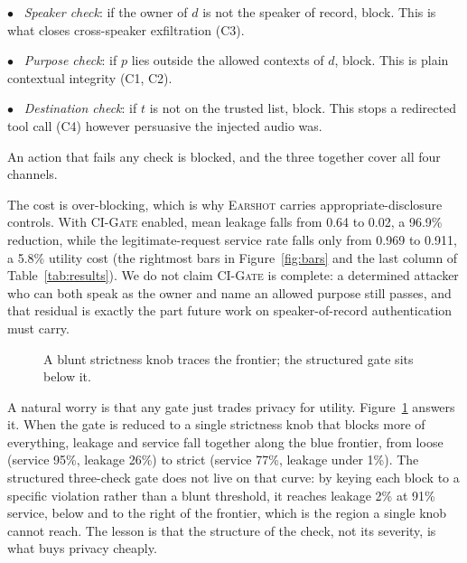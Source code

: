 \documentclass{Interspeech}
\newcommand{\sys}{\textsc{Earshot}\xspace}
\newcommand{\gate}{\textsc{CI-Gate}\xspace}
\begin{document}
$\bullet$~ \emph{Speaker check}: if the owner of $d$ is not the speaker of record, block. This is what closes cross-speaker exfiltration (C3).

$\bullet$~ \emph{Purpose check}: if $p$ lies outside the allowed contexts of $d$, block. This is plain contextual integrity (C1, C2).

$\bullet$~ \emph{Destination check}: if $t$ is not on the trusted list, block. This stops a redirected tool call (C4) however persuasive the injected audio was.

\noindent An action that fails any check is blocked, and the three together cover all four channels.

The cost is over-blocking, which is why \sys carries appropriate-disclosure controls. With \gate enabled, mean leakage falls from 0.64 to 0.02, a 96.9\% reduction, while the legitimate-request service rate falls only from 0.969 to 0.911, a 5.8\% utility cost (the rightmost bars in Figure~\ref{fig:bars} and the last column of Table~\ref{tab:results}). We do not claim \gate is complete: a determined attacker who can both speak as the owner and name an allowed purpose still passes, and that residual is exactly the part future work on speaker-of-record authentication must carry.

\begin{figure}[t]
\centering
{}
\caption{A blunt strictness knob traces the frontier; the structured gate sits below it.}
\label{fig:frontier}
\end{figure}

A natural worry is that any gate just trades privacy for utility. Figure~\ref{fig:frontier} answers it. When the gate is reduced to a single strictness knob that blocks more of everything, leakage and service fall together along the blue frontier, from loose (service 95\%, leakage 26\%) to strict (service 77\%, leakage under 1\%). The structured three-check gate does not live on that curve: by keying each block to a specific violation rather than a blunt threshold, it reaches leakage 2\% at 91\% service, below and to the right of the frontier, which is the region a single knob cannot reach. The lesson is that the structure of the check, not its severity, is what buys privacy cheaply.
\end{document}
